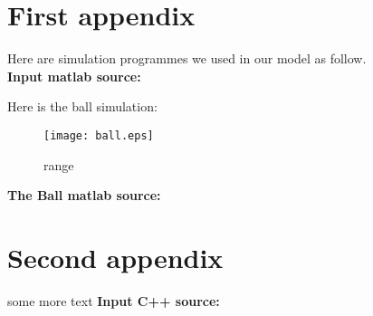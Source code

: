 \documentclass{mcmthesis}
\begin{document}
\begin{appendices}

\section{First appendix}

Here are simulation programmes we used in our model as follow.\\

\textbf{\textcolor[rgb]{0.98,0.00,0.00}{Input matlab source:}}


Here is the ball simulation:\\

\begin{figure}[h]
\small
\centering
\texttt{[image: ball.eps]}
\caption{range} \label{fig:ball}
\end{figure}

\textbf{\textcolor[rgb]{0.98,0.00,0.00}{The Ball matlab source:}}



\section{Second appendix}

some more text \textcolor[rgb]{0.00,0.90,0.00}{\textbf{Input C++ source:}}


\end{appendices}
\end{document}
